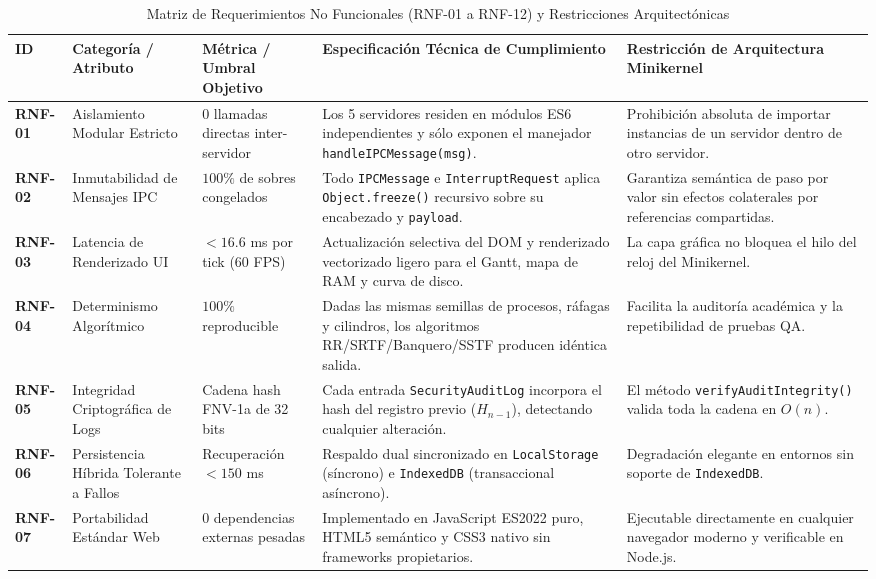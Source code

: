 \documentclass[10pt,twocolumn,letterpaper]{article}
\begin{document}
\begin{table}[!t]
\caption{Matriz de Requerimientos No Funcionales (RNF-01 a RNF-12) y Restricciones Arquitect\'onicas}
\label{tab:rnf}
\centering
\scriptsize
\renewcommand{\arraystretch}{1.18}
\begin{tabularx}{\textwidth}{C{1.0cm} L{2.6cm} L{2.8cm} Y L{3.6cm}}
\toprule
\textbf{ID} & \textbf{Categor\'ia / Atributo} & \textbf{M\'etrica / Umbral Objetivo} & \textbf{Especificaci\'on T\'ecnica de Cumplimiento} & \textbf{Restricci\'on de Arquitectura Minikernel} \\
\midrule
\textbf{RNF-01} & Aislamiento Modular Estricto & $0$ llamadas directas inter-servidor & Los 5 servidores residen en m\'odulos ES6 independientes y s\'olo exponen el manejador \texttt{handleIPCMessage(msg)}. & Prohibici\'on absoluta de importar instancias de un servidor dentro de otro servidor. \\
\textbf{RNF-02} & Inmutabilidad de Mensajes IPC & $100\%$ de sobres congelados & Todo \texttt{IPCMessage} e \texttt{InterruptRequest} aplica \texttt{Object.freeze()} recursivo sobre su encabezado y \texttt{payload}. & Garantiza sem\'antica de paso por valor sin efectos colaterales por referencias compartidas. \\
\textbf{RNF-03} & Latencia de Renderizado UI & $< 16.6$ ms por tick ($60$ FPS) & Actualizaci\'on selectiva del DOM y renderizado vectorizado ligero para el Gantt, mapa de RAM y curva de disco. & La capa gr\'afica no bloquea el hilo del reloj del Minikernel. \\
\textbf{RNF-04} & Determinismo Algor\'itmico & $100\%$ reproducible & Dadas las mismas semillas de procesos, r\'afagas y cilindros, los algoritmos RR/SRTF/Banquero/SSTF producen id\'entica salida. & Facilita la auditor\'ia acad\'emica y la repetibilidad de pruebas QA. \\
\textbf{RNF-05} & Integridad Criptogr\'afica de Logs & Cadena hash FNV-1a de 32 bits & Cada entrada \texttt{SecurityAuditLog} incorpora el hash del registro previo ($H_{n-1}$), detectando cualquier alteraci\'on. & El m\'etodo \texttt{verifyAuditIntegrity()} valida toda la cadena en $O(n)$. \\
\textbf{RNF-06} & Persistencia H\'ibrida Tolerante a Fallos & Recuperaci\'on $< 150$ ms & Respaldo dual sincronizado en \texttt{LocalStorage} (s\'incrono) e \texttt{IndexedDB} (transaccional as\'incrono). & Degradaci\'on elegante en entornos sin soporte de \texttt{IndexedDB}. \\
\textbf{RNF-07} & Portabilidad Est\'andar Web & $0$ dependencias externas pesadas & Implementado en JavaScript ES2022 puro, HTML5 sem\'antico y CSS3 nativo sin frameworks propietarios. & Ejecutable directamente en cualquier navegador moderno y verificable en Node.js. \\

\end{tabularx}
\end{table}
\end{document}
